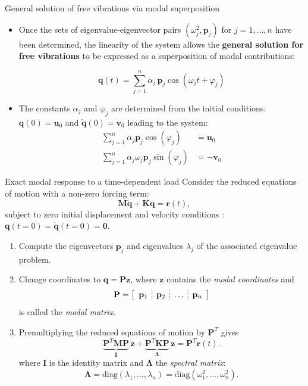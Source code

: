 \documentclass[aspectratio=169]{beamer}
\begin{document}
\begin{frame}{General solution of free vibrations via modal superposition}
  \small
  \begin{itemize}
    \item Once the sets of eigenvalue-eigenvector pairs \((\omega_j^2, \mathbf{p}_j)\) for $j=1,\dots,n$ have been determined, the linearity of the system allows the \textbf{general solution for free vibrations} to be expressed as a superposition of modal contributions:
          \begin{tcolorbox}[colback=darkred!10,colframe=darkred!40!black]
            \[
              \mathbf{q}(t) = \sum_{j=1}^n \alpha_j \, \mathbf{p}_j \cos(\omega_j t + \varphi_j)
            \]
          \end{tcolorbox}
    \item The constants \(\alpha_j\) and \(\varphi_j\) are determined from the initial conditions: $\mathbf{q}(0) = \mathbf{u}_0$ and $\dot{\mathbf{q}}(0) = \mathbf{v}_0$ leading to the system:
          \begin{align*}
            \sum_{j=1}^n \alpha_j \mathbf{p}_j \cos(\varphi_j)          & = \mathbf{u}_0  \\
            \sum_{j=1}^n \alpha_j \omega_j \mathbf{p}_j \sin(\varphi_j) & = -\mathbf{v}_0
          \end{align*}
  \end{itemize}
\end{frame}

\begin{frame}{Exact modal response to a time-dependent load}
  \small Consider the reduced equations of motion with a non-zero forcing term:
  \[
    \mathbf M\ddot{\mathbf q}+\mathbf K\mathbf q
    =\mathbf r(t),
  \]
  subject to zero initial displacement and velocity conditions : $\mathbf q(t=0)=\dot{\mathbf q}(t=0)=\mathbf{0}$.
  \begin{enumerate}
    \item Compute the eigenvectors $\mathbf p_j$ and eigenvalues $\lambda_j$ of the associated eigenvalue problem.
    \item  Change coordinates to $\mathbf q=\mathbf P\mathbf z$, where $\mathbf z$ contains the \emph{modal coordinates} and
          $$\mathbf P=\left[ \begin{array}{c;{2pt/2pt}c;{2pt/2pt}c;{2pt/2pt}c}
                \mathbf p_{1} & \mathbf p_{2} & \dots & \mathbf p_{n} \\
              \end{array}\right]$$
          is called the \emph{modal matrix}.
    \item Premultiplying the reduced equations of motion by $\mathbf P^T$ gives
          $$\underbrace{\mathbf P^T\mathbf M\mathbf P}_{\mathbf I}\,\ddot{\mathbf z}+\underbrace{\mathbf P^T\mathbf K\mathbf P}_{\mathbf\Lambda}\,\mathbf z=\mathbf P^T\mathbf r(t).$$
          where $\mathbf I$ is the identity matrix and $\mathbf\Lambda$ the \emph{spectral matrix}:
          $$\mathbf\Lambda=\text{diag}(\lambda_1,\dots,\lambda_n)=\text{diag}(\omega_1^2,\dots,\omega_n^2).$$
  \end{enumerate}
\end{frame}
\end{document}
